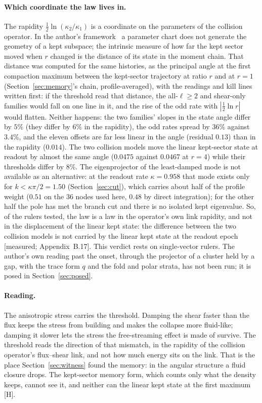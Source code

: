 \documentclass[11pt]{article}
\newcommand{\grade}[1]{\textsf{\small[#1]}}
\begin{document}
\paragraph{Which coordinate the law lives in.} The rapidity $\tfrac12\ln(\kappa_2/\kappa_1)$ is a coordinate on the parameters of the collision operator. In the author's framework~\cite{IQGT} a parameter chart does not generate the geometry of a kept subspace; the intrinsic measure of how far the kept sector moved when $r$ changed is the distance of its state in the moment chain. That distance was computed for the same histories, as the principal angle at the first compaction maximum between the kept-sector trajectory at ratio $r$ and at $r=1$ (Section~\ref{sec:memory}'s chain, profile-averaged), with the readings and kill lines written first: if the threshold read that distance, the all-$\ell\ge2$ and shear-only families would fall on one line in it, and the rise of the odd rate with $|\tfrac12\ln r|$ would flatten. Neither happens: the two families' slopes in the state angle differ by $5\%$ (they differ by $6\%$ in the rapidity), the odd rates spread by $36\%$ against $3.4\%$, and the eleven offsets are far less linear in the angle (residual $0.13$) than in the rapidity ($0.014$). The two collision models move the linear kept-sector state at readout by almost the same angle ($0.0475$ against $0.0467$ at $r=4$) while their thresholds differ by $8\%$. The eigenprojector of the least-damped mode is not available as an alternative: at the readout rate $\kappa=0.958$ that mode exists only for $k<\kappa\pi/2=1.50$ (Section~\ref{sec:cut}), which carries about half of the profile weight ($0.51$ on the $36$ nodes used here, $0.48$ by direct integration); for the other half the pole has met the branch cut and there is no isolated kept eigenvalue. So, of the rulers tested, the law is a law in the operator's own link rapidity, and not in the displacement of the linear kept state: the difference between the two collision models is not carried by the linear kept state at the readout epoch \grade{measured; Appendix~B.17}. This verdict rests on single-vector rulers. The author's own reading past the onset, through the projector of a cluster held by a gap, with the trace form $q$ and the fold and polar strata, has not been run; it is posed in Section~\ref{sec:posed}.

\paragraph{Reading.} The anisotropic stress carries the threshold. Damping the shear faster than the flux keeps the stress from building and makes the collapse more fluid-like; damping it slower lets the stress the free-streaming effect is made of survive. The threshold reads the direction of that mismatch, in the rapidity of the collision operator's flux--shear link, and not how much energy sits on the link. That is the place Section~\ref{sec:witness} found the memory: in the angular structure a fluid closure drops. The kept-sector memory form, which counts only what the density keeps, cannot see it, and neither can the linear kept state at the first maximum \grade{H}.
\end{document}
